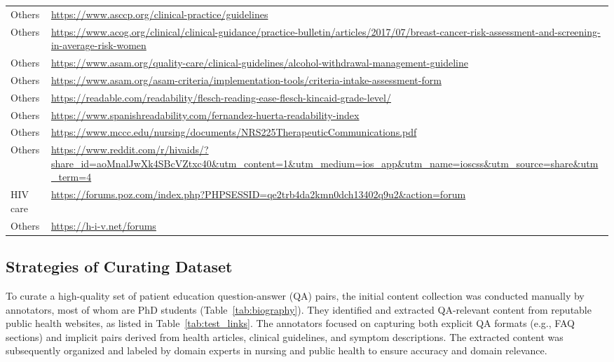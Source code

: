 \begin{table}[h]
{\begin{tabular}{ll}
Others & 	\url{https://www.asccp.org/clinical-practice/guidelines} \\
Others & 	\url{https://www.acog.org/clinical/clinical-guidance/practice-bulletin/articles/2017/07/breast-cancer-risk-assessment-and-screening-in-average-risk-women} \\
Others & 	\url{https://www.asam.org/quality-care/clinical-guidelines/alcohol-withdrawal-management-guideline} \\
Others & 	\url{https://www.asam.org/asam-criteria/implementation-tools/criteria-intake-assessment-form} \\
Others & 	\url{https://readable.com/readability/flesch-reading-ease-flesch-kincaid-grade-level/} \\
Others & 	\url{https://www.spanishreadability.com/fernandez-huerta-readability-index} \\
Others & 	\url{https://www.mccc.edu/nursing/documents/NRS225TherapeuticCommunications.pdf} \\
Others & 	\url{https://www.reddit.com/r/hivaids/?share_id=aoMnalJwXk4SBcVZtxc40&utm_content=1&utm_medium=ios_app&utm_name=ioscss&utm_source=share&utm_term=4} \\
HIV care & 	\url{https://forums.poz.com/index.php?PHPSESSID=qe2trb4da2kmn0dch13402q9u2&action=forum} \\
Others & 	\url{https://h-i-v.net/forums} \\
    \bottomrule
    \end{tabular}
    }
    \vspace{-0.1in}
    \label{tab:train_links}
\end{table}

\subsection{Strategies of Curating Dataset}\label{app:scrape}

To curate a high-quality set of patient education question-answer (QA) pairs, the initial content collection was conducted manually by annotators, most of whom are PhD students (Table~\ref{tab:biography}).
They identified and extracted QA-relevant content from reputable public health websites, as listed in Table~\ref{tab:test_links}.
The annotators focused on capturing both explicit QA formats (e.g., FAQ sections) and implicit pairs derived from health articles, clinical guidelines, and symptom descriptions. The extracted content was subsequently organized and labeled by domain experts in nursing and public health to ensure accuracy and domain relevance.

